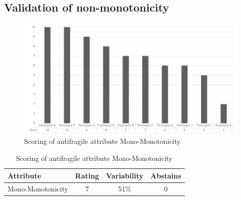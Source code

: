 \subsection{Validation of non-monotonicity}
\begin{figure}[H]
	\centering
	\includegraphics[width=0.9\linewidth]{images/scoreafmonomonotonicity}
	\caption[Scoring of antifragile attribute Mono-Monotonicity]{Scoring of antifragile attribute Mono-Monotonicity}
	\label{fig:appscoringafmonomonotonicity}
\end{figure}
\begin{table}[h!]
	\centering
	\begin{tabular}{p{}ccc}
		\toprule
		\textbf{Attribute} & \textbf{Rating} & \textbf{Variability} & \textbf{Abstains} \\
		\midrule
		Mono-Monotonicity & 7 & 51\% & 0 \\%
		\bottomrule
	\end{tabular}%
	\caption[Scoring of antifragile attribute Mono-Monotonicity]{Scoring of antifragile attribute Mono-Monotonicity}
	\label{tab:appscoringafmonomonotonicity}%
\end{table}%
\newpage
